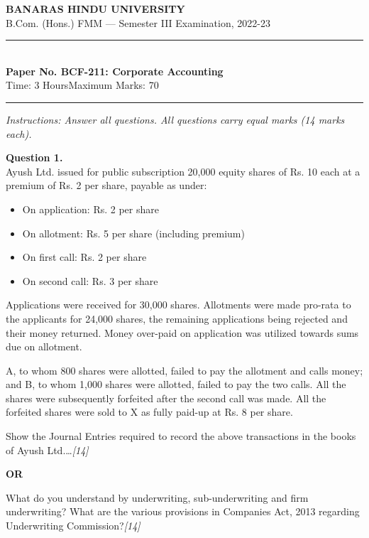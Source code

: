 \documentclass[11pt,a4paper]{article}
\newcommand{\pts}[1]{\hfill   \textit{[#1]}}
\begin{document}
\begin{center}
  {\large\bfseries BANARAS HINDU UNIVERSITY}\\[2pt]
  {\normalsize B.Com. (Hons.) FMM --- Semester III Examination, 2022-23}\\[6pt]
  \rule{0.8\linewidth}{0.5pt}\\[6pt]
  {\large\bfseries Paper No. BCF-211: Corporate Accounting}\\[4pt]
  {\normalsize Time: 3 Hours\hfill Maximum Marks: 70}
\end{center}

\rule{\linewidth}{0.4pt}

\smallskip



\noindent   \textit{Instructions: Answer all questions. All questions carry equal marks (14 marks each).}

\bigskip




\noindent   \textbf{Question 1.} \\
Ayush Ltd. issued for public subscription 20,000 equity shares of Rs. 10 each at a premium of Rs. 2 per share, payable as under:

\begin{itemize}
  \item On application: Rs. 2 per share
  \item On allotment: Rs. 5 per share (including premium)
  \item On first call: Rs. 2 per share
  \item On second call: Rs. 3 per share
\end{itemize}
Applications were received for 30,000 shares. Allotments were made pro-rata to the applicants for 24,000 shares, the remaining applications being rejected and their money returned. Money over-paid on application was utilized towards sums due on allotment.

A, to whom 800 shares were allotted, failed to pay the allotment and calls money; and B, to whom 1,000 shares were allotted, failed to pay the two calls. All the shares were subsequently forfeited after the second call was made. All the forfeited shares were sold to X as fully paid-up at Rs. 8 per share.

Show the Journal Entries required to record the above transactions in the books of Ayush Ltd.\dots\pts{14}

\centerline{   \textbf{OR}}

What do you understand by underwriting, sub-underwriting and firm underwriting? What are the various provisions in Companies Act, 2013 regarding Underwriting Commission?\pts{14}
\end{document}
